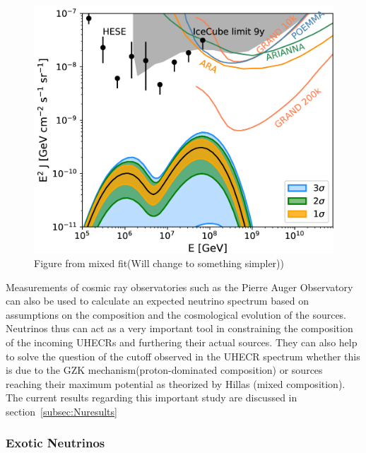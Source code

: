 \begin{figure}[t!]
  \centering
  \includegraphics[width=14.5cm]{thesis_figures/CRnNu/apjab05cef9_hr.jpg}
  \caption{Figure from mixed fit(Will change to something simpler))~\cite{Heinze:2019jou}}
  \label{fig:model_nu_auger_mixed}
\end{figure}

Measurements of cosmic ray observatories such as the Pierre Auger Observatory can also be used to calculate an expected neutrino spectrum based on assumptions on the composition and the cosmological evolution of the sources. Neutrinos thus can act as a very important tool in constraining the composition of the incoming UHECRs and furthering their actual sources. They can also help to solve the question of the cutoff observed in the UHECR spectrum whether this is due to the GZK mechanism(proton-dominated composition) or sources reaching their maximum potential as theorized by Hillas (mixed composition). The current results regarding this important study are discussed in section~\ref{subsec:Nuresults}


\subsubsection*{Exotic Neutrinos}
\label{subsubsec:ExoticNu}

